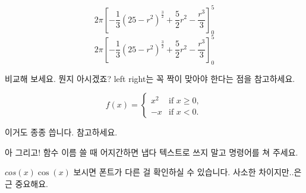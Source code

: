 \documentclass{article}
\begin{document}
\[ 2\pi [-\frac{1}{3}(25-r^2)^{\frac{3}{2}} + \frac{5}{2}r^2 - \frac{r^3}{3}]_{0}^{5} \]
\[ 2\pi \left[ -\frac{1}{3}(25-r^2)^{\frac{3}{2}} + \frac{5}{2}r^2 - \frac{r^3}{3} \right]_{0}^{5} \]

비교해 보세요. 뭔지 아시겠죠?
left right는 꼭 짝이 맞아야 한다는 점을 참고하세요.

\[
f(x) =
\begin{cases} 
x^2 & \text{if } x \geq 0, \\
-x  & \text{if } x < 0.
\end{cases}
\]

이거도 종종 씁니다. 참고하세요.

아 그리고! 함수 이름 쓸 때 어지간하면 냅다 텍스트로 쓰지 말고 명령어를 쳐 주세요.

\(cos(x) \cos(x)\) 보시면 폰트가 다른 걸 확인하실 수 있습니다. 사소한 차이지만..은근 중요해요.
\end{document}
